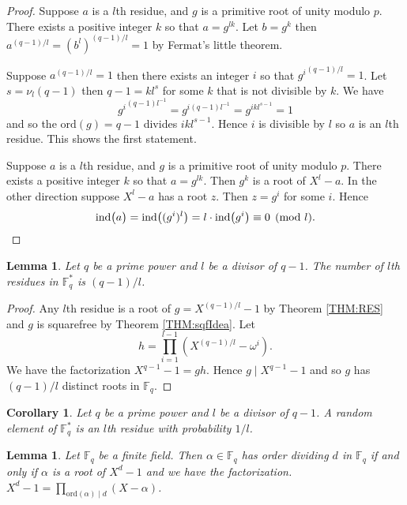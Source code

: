 \documentclass{article}
\let\originalleft\left
\let\originalright\right
\renewcommand{\left}{\mathopen{}\mathclose\bgroup\originalleft}
\renewcommand{\right}{\aftergroup\egroup\originalright}
\newcounter{dummy} \numberwithin{dummy}{section}
\theoremstyle{plain}
\newtheorem{cor}[dummy]{Corollary}
\newtheorem{lem}[dummy]{Lemma}
\theoremstyle{definition}
\def\Fq {{ \mathbb{F} _ {q} }}
\def\FQ {{ \mathbb{F}^* _ {q} }}
\def\ind {{ \mathrm{ind} }}
\def\ord {{ \mathrm{ord} }}
\begin{document}
		\begin{proof}
		     Suppose $a$ is a $l$th residue, and $g$ is a primitive root of unity modulo $p$. There exists a positive integer $k$ so that $a=g^{lk}$. Let $b=g^k$ then $a^{(q-1)/l}=(b^l)^{(q-1)/l}=1$ by Fermat's little theorem.
				
				 Suppose $a^{(q-1)/l}=1$ then there exists an integer $i$ so that ${g^i}^{(q-1)/l}=1$. Let $s=\nu_l(q-1)$ then $q-1=kl^s$ for some $k$ that is not divisible by $k$. We have 
				 \[ {g^i}^{(q-1)l^{-1}}=g^{i(q-1)l^{-1}}=g^{ikl^{s-1}}=1 \]
				 and so the $\ord(g)=q-1$ divides $ikl^{s-1}$. Hence $i$ is divisible by $l$ so $a$ is an $l$th residue. This shows the first statement.
				
				Suppose $a$ is a $l$th residue, and $g$ is a primitive root of unity modulo $p$. There exists a positive integer $k$ so that $a=g^{lk}$. Then $g^k$ is a root of $X^l-a$. In the other direction suppose $X^l-a$ has a root $z$. Then $z=g^i$ for some $i$. Hence 
				\[ \ind \bigl( a \bigr)=\ind \bigl( ( g^i )^l \bigr)=l\cdot\ind \left( g^i \right) \equiv 0 \pmod l. \]
		\end{proof}
		
		\begin{lem}
		\label{LEM:NumRes}
		    Let $q$ be a prime power and $l$ be a divisor of $q-1$. The number of $l$th residues in $\FQ$ is $(q-1)/l$. 
		\end{lem}
		
		\begin{proof}
		    Any $l$th residue is a root of $g=X^{(q-1)/l}-1$ by Theorem \ref{THM:RES} and $g$ is squarefree by Theorem \ref{THM:sqfIdea}. Let \[ h=\prod_{i=1}^{l-1}{(X^{(q-1)/l}-\omega^i)}. \] We have the factorization $X^{q-1}-1=gh$. Hence $g \mid X^{q-1}-1$ and so $g$ has $(q-1)/l$ distinct roots in $\Fq$. 
		\end{proof}
		
		\begin{cor}
		\label{COR:resProb}
		    Let $q$ be a prime power and $l$ be a divisor of $q-1$. A random element of $\FQ$ is an $l$th residue with probability $1/l$.
		\end{cor}
		
		\begin{lem}
		\label{LEM:ordProd}
				Let $\Fq$ be a finite field. Then $\alpha \in \Fq$ has order dividing $d$ in $\Fq$ if and only if $\alpha$ is a root of $X^d-1$ and we have the factorization. $X^d-1=\prod_{\ord(\alpha) \mid d}{(X-\alpha)}$. 
		\end{lem}
		
\end{document}
